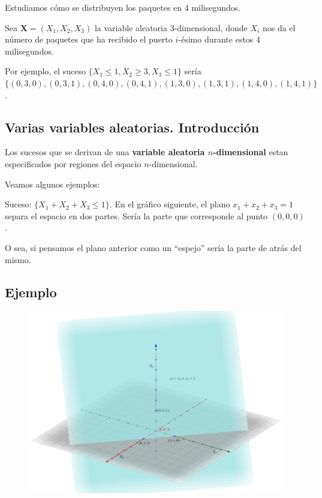 \documentclass[]{book}
\begin{document}
Estudiamos cómo se distribuyen los paquetes en 4 milisegundos.

Sea \(\mathbf{X}=(X_1,X_2,X_3)\) la variable aleatoria 3-dimensional, donde \(X_i\) nos da el número de paquetes que ha recibido el puerto \(i\)-ésimo durante estos 4 milisegundos.

Por ejemplo, el suceso \(\{X_1\leq 1, X_2\geq 3, X_3\leq 1\}\) sería \(\{(0,3,0),(0,3,1),(0,4,0),(0,4,1),(1,3,0),(1,3,1),(1,4,0),(1,4,1)\}\).

\hypertarget{varias-variables-aleatorias.-introducciuxf3n}{%
\subsection{Varias variables aleatorias. Introducción}\label{varias-variables-aleatorias.-introducciuxf3n}}

Los sucesos que se derivan de una \textbf{variable aleatoria \(n\)-dimensional} estan especificados por regiones del espacio \(n\)-dimensional.

Veamos algunos ejemplos:

Suceso: \(\{X_1+X_2+X_3\leq 1\}\). En el gráfico siguiente, el plano \(x_1+x_2+x_3=1\) separa el espacio en dos partes. Sería la parte que corresponde al punto \((0,0,0)\).

O sea, si pensamos el plano anterior como un ``espejo'' sería la parte de atrás del mismo.

\hypertarget{ejemplo-82}{%
\subsection{Ejemplo}\label{ejemplo-82}}

\begin{figure}
\includegraphics[width=650px]{Images/EjPlano3D} \end{figure}
\end{document}

